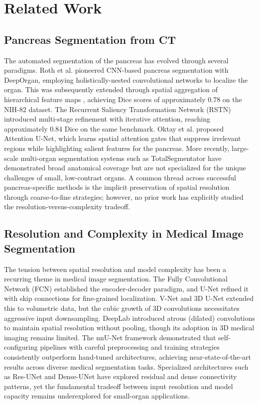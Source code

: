 \documentclass[journal, twocolumn]{IEEEtran}
\begin{document}
\section{Related Work}

\subsection{Pancreas Segmentation from CT}
The automated segmentation of the pancreas has evolved through several paradigms. Roth et al. \cite{nih} pioneered CNN-based pancreas segmentation with DeepOrgan, employing holistically-nested convolutional networks to localize the organ. This was subsequently extended through spatial aggregation of hierarchical feature maps \cite{pancreas_ct}, achieving Dice scores of approximately 0.78 on the NIH-82 dataset. The Recurrent Saliency Transformation Network (RSTN) \cite{rstn} introduced multi-stage refinement with iterative attention, reaching approximately 0.84 Dice on the same benchmark. Oktay et al. \cite{attunet} proposed Attention U-Net, which learns spatial attention gates that suppress irrelevant regions while highlighting salient features for the pancreas. More recently, large-scale multi-organ segmentation systems such as TotalSegmentator \cite{totalseg} have demonstrated broad anatomical coverage but are not specialized for the unique challenges of small, low-contrast organs. A common thread across successful pancreas-specific methods is the implicit preservation of spatial resolution through coarse-to-fine strategies; however, no prior work has explicitly studied the resolution-versus-complexity tradeoff.

\subsection{Resolution and Complexity in Medical Image Segmentation}
The tension between spatial resolution and model complexity has been a recurring theme in medical image segmentation. The Fully Convolutional Network (FCN) \cite{long2015fully} established the encoder-decoder paradigm, and U-Net \cite{unet} refined it with skip connections for fine-grained localization. V-Net \cite{vnet} and 3D U-Net \cite{cciccek20163d} extended this to volumetric data, but the cubic growth of 3D convolutions necessitates aggressive input downsampling. DeepLab \cite{deeplab} introduced atrous (dilated) convolutions to maintain spatial resolution without pooling, though its adoption in 3D medical imaging remains limited. The nnU-Net framework \cite{nnunet} demonstrated that self-configuring pipelines with careful preprocessing and training strategies consistently outperform hand-tuned architectures, achieving near-state-of-the-art results across diverse medical segmentation tasks. Specialized architectures such as Res-UNet \cite{resunet} and Dense-UNet \cite{denseunet} have explored residual and dense connectivity patterns, yet the fundamental tradeoff between input resolution and model capacity remains underexplored for small-organ applications.
\end{document}
